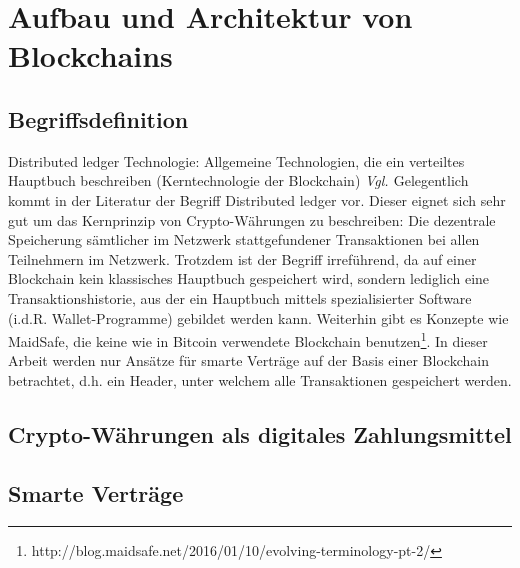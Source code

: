 \chapter{Aufbau und Architektur von Blockchains}
\section{Begriffsdefinition}
Distributed ledger Technologie: Allgemeine Technologien, die ein verteiltes Hauptbuch beschreiben (Kerntechnologie der Blockchain) \textit{Vgl. \cite{Geiling.2016}}
Gelegentlich kommt in der Literatur der Begriff Distributed ledger vor. Dieser eignet sich sehr gut um das Kernprinzip von Crypto-Währungen zu beschreiben: Die dezentrale Speicherung sämtlicher im Netzwerk stattgefundener Transaktionen bei allen Teilnehmern im Netzwerk. Trotzdem ist der Begriff irreführend, da auf einer Blockchain kein klassisches Hauptbuch gespeichert wird, sondern lediglich eine Transaktionshistorie, aus der ein Hauptbuch mittels spezialisierter Software (i.d.R. \glqq Wallet\grqq{}-Programme) gebildet werden kann. Weiterhin gibt es Konzepte wie MaidSafe, die keine wie in Bitcoin verwendete Blockchain benutzen\footnote{http://blog.maidsafe.net/2016/01/10/evolving-terminology-pt-2/}. In dieser Arbeit werden nur Ansätze für smarte Verträge auf der Basis einer Blockchain betrachtet, d.h. ein Header, unter welchem alle Transaktionen gespeichert werden.
\section{Crypto-Währungen als digitales Zahlungsmittel}
\section{Smarte Verträge}
